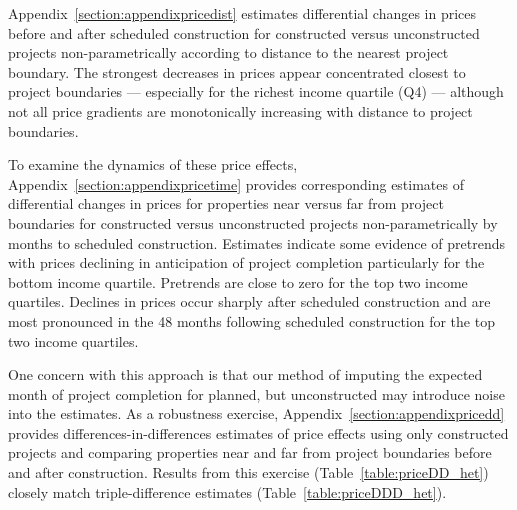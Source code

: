 \documentclass[12pt]{article}
\begin{document}
Appendix~\ref{section:appendixpricedist} estimates differential changes in prices before and after scheduled construction for constructed versus unconstructed projects non-parametrically according to distance to the nearest project boundary.  The strongest decreases in prices appear concentrated closest to project boundaries --- especially for the richest income quartile (Q4) --- although not all price gradients are monotonically increasing with distance to project boundaries.  

To examine the dynamics of these price effects, Appendix~\ref{section:appendixpricetime} provides corresponding estimates of differential changes in prices for properties near versus far from project boundaries for constructed versus unconstructed projects non-parametrically by months to scheduled construction.  Estimates indicate some evidence of pretrends with prices declining in anticipation of project completion particularly for the bottom income quartile.  Pretrends are close to zero for the top two income quartiles.  Declines in prices occur sharply after scheduled construction and are most pronounced in the 48 months following scheduled construction for the top two income quartiles.

One concern with this approach is that our method of imputing the expected month of project completion for planned, but unconstructed  may introduce noise into the estimates.  As a robustness exercise, Appendix~\ref{section:appendixpricedd} provides differences-in-differences estimates of price effects using only constructed projects and comparing properties near and far from project boundaries before and after construction.  Results from this exercise (Table~\ref{table:priceDD_het}) closely match triple-difference estimates (Table~\ref{table:priceDDD_het}).

\end{document}
